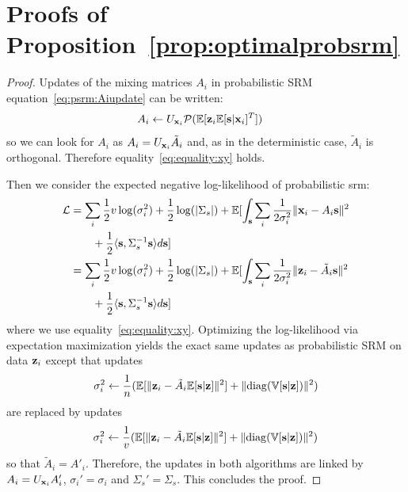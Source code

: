 \documentclass{article}
\begin{document}
\section{Proofs of Proposition~\ref{prop:optimalprobsrm}}
\label{proof:prob}
\begin{proof}
  Updates of the mixing matrices $A_i$ in probabilistic SRM
  equation~\eqref{eq:psrm:Aiupdate} can be written:
  \begin{align}
    A_i &\leftarrow U_{\mathbf{x}_i}\mathcal{P}(\mathbb{E}[\mathbf{z}_i \mathbb{E}[\mathbf{s}| \mathbf{x}_i]^T])
    \label{eq:fastprobsrm:Aiupdate}
  \end{align}
  so we can look for $A_i$ as $A_i = U_{\mathbf{x}_i} \tilde{A}_i$ and, as in the
  deterministic case, $\tilde{A}_i$ is orthogonal.
  Therefore equality~\eqref{eq:equality:xy} holds.
  
  
  Then we consider the expected negative log-likelihood of probabilistic srm:
  \begin{align}
    \mathcal{L} &= \sum_i \frac12 v\log(\sigma_i^2) + \frac12 \log(|\Sigma_s|) + \mathbb{E}[\int_{\mathbf{s}} \sum_i \frac1{2 \sigma_i^{2}} \|\mathbf{x}_i - A_i \mathbf{s} \|^2 \nonumber \\& \enspace \enspace \enspace \enspace+ \frac12 \langle{ \mathbf{s}},{ \Sigma_s^{-1} \mathbf{s} }\rangle  d\mathbf{s}] \\
          &= \sum_i \frac12 v \log(\sigma_i^2) + \frac12 \log(|\Sigma_s|) + \mathbb{E}[\int_{\mathbf{s}} \sum_i \frac1{2 \sigma_i^{2}}\|\mathbf{z}_i - \tilde{A}_i \mathbf{s} \|^2 \nonumber \\& \enspace \enspace \enspace \enspace+ \frac12 \langle{ \mathbf{s}},{ \Sigma_s^{-1} \mathbf{s} }\rangle  d\mathbf{s}]
  \end{align}
  where we use equality~\eqref{eq:equality:xy}.
  Optimizing the log-likelihood via expectation maximization yields the exact
  same updates as probabilistic SRM on data $\mathbf{z}_i$
  except that updates
  \begin{align}
    \sigma_i^2 \leftarrow \frac1{n} (\mathbb{E}[\| \mathbf{z}_i - \tilde{A}_i \mathbb{E}[\mathbf{s}|\mathbf{z}]\|^2] + \| {\rm diag}(\mathbb{V}[\mathbf{s} | \mathbf{z}]) \|^2)
  \end{align}
  are replaced by updates
  \begin{align}
    \sigma_i^2 \leftarrow \frac1{v} (\mathbb{E}[\| \mathbf{z}_i - \tilde{A}_i \mathbb{E}[\mathbf{s}|\mathbf{z}]\|^2] + \| {\rm diag}(\mathbb{V}[\mathbf{s} | \mathbf{z}]) \|^2)
  \end{align}
  so that $\tilde{A}_i = A'_i$.
  Therefore, the updates in both algorithms are linked  by $A_i = U_{\mathbf{x}_i}A_i'$,
  $\sigma_i' =
  \sigma_i$ and $\Sigma_s'  = \Sigma_s$.
  This concludes the proof.
\end{proof}
\end{document}
